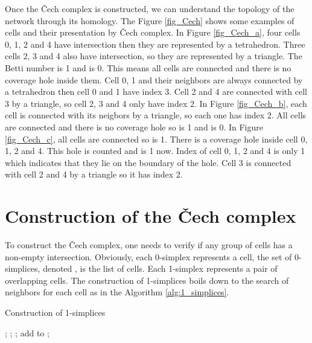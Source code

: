 \documentclass[conference]{IEEEtran}
\begin{document}
Once the \v{C}ech complex is constructed, we can understand the topology of the network through its homology. The Figure \ref{fig_Cech} shows some examples of cells and their presentation by \v{C}ech complex. In Figure \ref{fig_Cech_a}, four cells 0, 1, 2  and 4 have intersection then they are represented by a tetrahedron. Three cells 2, 3 and 4 also have intersection, so they are represented by a triangle. The Betti number  is 1 and  is 0. This means all cells are connected and there is no coverage hole inside them. Cell 0, 1 and their neighbors are always connected by a tetrahedron then cell 0 and 1 have index 3. Cell 2 and 4 are connected with cell 3 by a triangle, so cell 2, 3 and 4 only have index 2. In Figure \ref{fig_Cech_b}, each cell is connected with its neigbors by a triangle, so each one has index 2. All cells are connected and there is no coverage hole so  is 1 and  is 0. In Figure \ref{fig_Cech_c}, all cells are connected so  is 1. There is a coverage hole inside cell 0, 1, 2 and 4. This hole is counted and  is 1 now. Index of cell 0, 1, 2 and 4 is only 1 which indicates that they lie on the boundary of the hole. Cell 3 is connected with cell 2 and 4 by a triangle so it has index 2.

\section{Construction of the \v{C}ech complex}
\label{sec:algorithm}

To construct the \v{C}ech complex, one needs to verify if any group of cells has a non-empty intersection. Obviously, each 0-simplex represents a cell, the set of 0-simplices, denoted , is the list of cells. Each 1-simplex represents a pair of overlapping cells. The construction of 1-simplices boils down to
the search of neighbors for each cell as in the Algorithm \ref{alg:1_simplices}.\par

\begin{algorithm}[H]
\caption{Construction of 1-simplices}
\label{alg:1_simplices}
\begin{algorithmic}
\REQUIRE  {};
	\STATE ; 
	\STATE ;
	\FOR{}
		\FOR{}
				\STATE add  to ;
			\ENDIF
		\ENDFOR
	\ENDFOR
	\RETURN {}
\end{algorithmic}
\end{algorithm}
\end{document}
